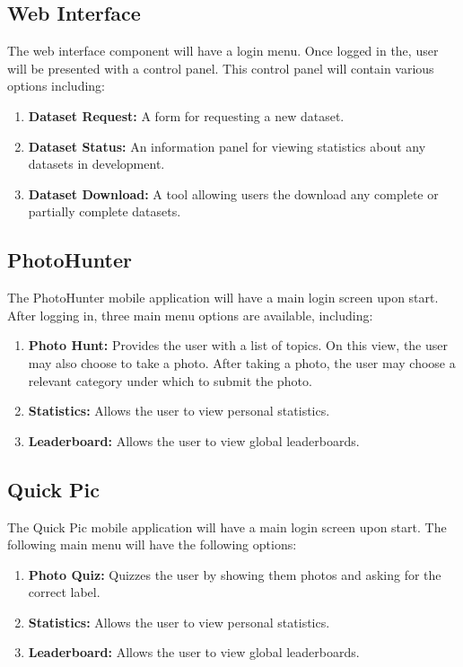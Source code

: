 \documentclass{article}
\begin{document}
\subsection{Web Interface}
The web interface component will have a login menu. Once logged in the, user will be presented with a control panel. This control panel will contain various options including:

\begin{enumerate}
\item \textbf{Dataset Request:} A form for requesting a new dataset.
\item \textbf{Dataset Status:} An information panel for viewing statistics about any datasets in development.
\item \textbf{Dataset Download:} A tool allowing users the download any complete or partially complete datasets.
\end{enumerate}
	
\subsection{PhotoHunter}
The PhotoHunter mobile application will have a main login screen upon start. After logging in, three main menu options are available, including:

\begin{enumerate}
\item \textbf{Photo Hunt:} Provides the user with a list of topics. On this view, the user may also choose to take a photo. After taking a photo, the user may choose a relevant category under which to submit the photo.
\item \textbf{Statistics:} Allows the user to view personal statistics.
\item \textbf{Leaderboard:} Allows the user to view global leaderboards.
\end{enumerate}
	
\subsection{Quick Pic}
The Quick Pic mobile application will have a main login screen upon start. The following main menu will have the following options:

\begin{enumerate}
\item \textbf {Photo Quiz:} Quizzes the user by showing them photos and asking for the correct label.
\item \textbf{Statistics:} Allows the user to view personal statistics.
\item \textbf{Leaderboard:} Allows the user to view global leaderboards.
\end{enumerate}
	 
\end{document}

